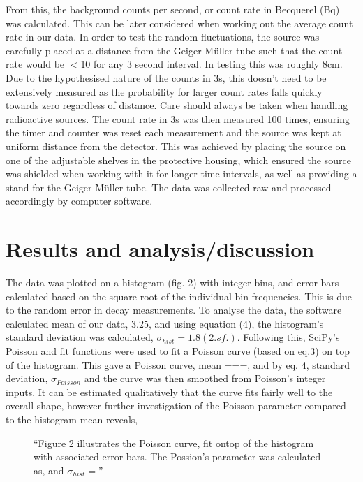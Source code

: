 \documentclass[11pt]{article}
\begin{document}
    From this, the background counts per second, or count rate in Becquerel (Bq) was calculated. This can be later considered when working out the average count rate in our data. 
    \newline
    In order to test the random fluctuations, the  source was carefully placed at a distance from the Geiger-Müller tube such that the count rate would be $<$10 for any 3 second interval. In testing this was roughly 8cm. Due to the hypothesised nature of the counts in 3s, this doesn't need to be extensively measured as the probability for larger count rates falls quickly towards zero regardless of distance. Care should always be taken when handling radioactive sources. 
    \newline
    The count rate in 3s was then measured 100 times, ensuring the timer and counter was reset each measurement and the source was kept at uniform distance from the detector. This was achieved by placing the source on one of the adjustable shelves in the protective housing, which ensured the source was shielded when working with it for longer time intervals, as well as providing a stand for the Geiger-Müller tube. The data was collected raw and processed accordingly by computer software. 
    \newline 
    
    \section{Results and analysis/discussion}
    The data was plotted on a histogram (fig. 2) with integer bins, and error bars calculated based on the square root of the individual bin frequencies. This is due to the random error in decay measurements. 
    \newline
    To analyse the data, the software calculated mean of our data, $3.25$, and using equation (4), the histogram's standard deviation was calculated, $\sigma_{hist} = 1.8 (2.sf.)$. Following this, SciPy's Poisson and fit functions were used to fit a Poisson curve (based on eq.3) on top of the histogram. This gave a Poisson curve, mean ===, and by eq. 4, standard deviation, $\sigma_{Poisson}$ and the curve was then smoothed from Poisson's integer inputs. 
    It can be estimated qualitatively that the curve fits fairly well to the overall shape, however further investigation of the Poisson parameter compared to the histogram mean reveals, 
       \begin{figure}[]
        \begin{center}
            \def\svgwidth{\columnwidth}
            
             \caption{“Figure 2 illustrates the Poisson curve, fit ontop of the histogram with associated error bars. The Possion's parameter was calculated as, and $\sigma_{hist} = $”}
             \label{fig:experimental results 1}
        \end{center}
    \end{figure}
\end{document}
